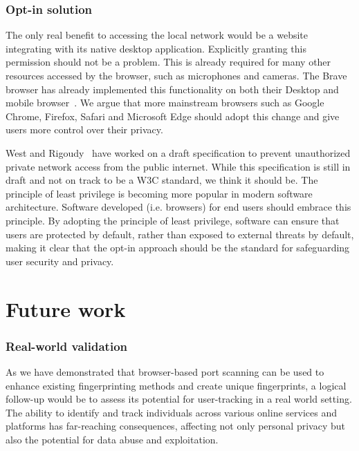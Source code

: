 \subsubsection{Opt-in solution}
The only real benefit to accessing the local network would be a website integrating with its native desktop application. Explicitly granting this permission should not be a problem. This is already required for many other resources accessed by the browser, such as microphones and cameras.
The Brave browser has already implemented this functionality on both their Desktop and mobile browser~. We argue that more mainstream browsers such as Google Chrome, Firefox, Safari and Microsoft Edge should adopt this change and give users more control over their privacy. 

West and Rigoudy~ have worked on a draft specification to prevent unauthorized private network access from the public internet. While this specification is still in draft and not on track to be a W3C standard, we think it should be. 
The principle of least privilege is becoming more popular in modern software architecture. Software developed (i.e. browsers) for end users should embrace this principle. By adopting the principle of least privilege, software can ensure that users are protected by default, rather than exposed to external threats by default, making it clear that the opt-in approach should be the standard for safeguarding user security and privacy.





\section{Future work}

\subsubsection{Real-world validation}

As we have demonstrated that browser-based port scanning can be used to enhance existing fingerprinting methods and create unique fingerprints, a logical follow-up would be to assess its potential for user-tracking in a real world setting.
The ability to identify and track individuals across various online services and platforms has far-reaching consequences, affecting not only personal privacy but also the potential for data abuse and exploitation.

